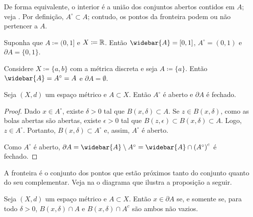 De forma equivalente, o interior é a união dos conjuntos abertos contidos
em $A$; veja . Por definição,
$A^\circ \subset A$; contudo, os pontos da fronteira podem ou não pertencer
a $A$.

\begin{example}
Suponha que $A \coloneqq (0,1]$ e $X \coloneqq {\mathbb{R}}$. Então
$\widebar{A}=[0,1]$, $A^\circ = (0,1)$ e $\partial A = \{ 0, 1 \}$.
\end{example}

\begin{example}
Considere $X \coloneqq \{ a, b \}$ com a métrica discreta e seja
$A \coloneqq \{ a \}$. Então $\widebar{A} = A^\circ = A$ e
$\partial A = \emptyset$.
\end{example}

\begin{prop}
Seja $(X,d)$ um espaço métrico e $A \subset X$. Então $A^\circ$ é aberto
e $\partial A$ é fechado.
\end{prop}

\begin{proof}
Dado $x \in A^\circ$, existe $\delta > 0$ tal que $B(x,\delta) \subset A$.
Se $z \in B(x,\delta)$, como as bolas abertas são abertas, existe
$\epsilon > 0$ tal que $B(z,\epsilon) \subset B(x,\delta) \subset A$.
Logo, $z \in A^\circ$. Portanto, $B(x,\delta) \subset A^\circ$ e,
assim, $A^\circ$ é aberto.

Como $A^\circ$ é aberto,
$\partial A = \widebar{A} \setminus A^\circ = \widebar{A} \cap
{(A^\circ)}^c$ é fechado.
\end{proof}

A fronteira é o conjunto dos pontos que estão próximos tanto do conjunto
quanto do seu complementar. Veja na  o diagrama
que ilustra a proposição a seguir.

\begin{prop}
Seja $(X,d)$ um espaço métrico e $A \subset X$. Então $x \in \partial A$
se, e somente se, para todo $\delta > 0$,
$B(x,\delta) \cap A$ e
$B(x,\delta) \cap A^c$ são ambos não vazios.
\end{prop}

\begin{myfigureht}
\caption{A fronteira é o conjunto dos pontos cujas bolas contêm pontos do
conjunto e também do seu complementar.\label{fig:msboundary}}
\end{myfigureht}

